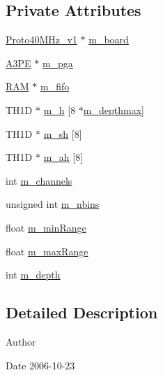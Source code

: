 \subsection*{Private Attributes}
\begin{DoxyCompactItemize}
\item 
\hyperlink{classProto40MHz__v1}{Proto40MHz\_\-v1} $\ast$ \hyperlink{classStorageFifoAcquisition_a86f825b4740c5dcde26933b6debf452f}{m\_\-board}
\item 
\hyperlink{classA3PE}{A3PE} $\ast$ \hyperlink{classStorageFifoAcquisition_a30a158fb750e33fbec4f2f9ee8cbb68f}{m\_\-pga}
\item 
\hyperlink{classRAM}{RAM} $\ast$ \hyperlink{classStorageFifoAcquisition_a5405a161dc3983274ccdfdf83687d98d}{m\_\-fifo}
\item 
TH1D $\ast$ \hyperlink{classStorageFifoAcquisition_a19913cfc87da82b107e49399e3e9b754}{m\_\-h} \mbox{[}8 $\ast$\hyperlink{classStorageFifoAcquisition_a2f3ce0569ee9ec4fa78ec66a9cbe6ed7}{m\_\-depthmax}\mbox{]}
\item 
TH1D $\ast$ \hyperlink{classStorageFifoAcquisition_ace3efa07a424f66783388ad073b31830}{m\_\-sh} \mbox{[}8\mbox{]}
\item 
TH1D $\ast$ \hyperlink{classStorageFifoAcquisition_ac73454f960b6224d7fe3d104b4b7a51b}{m\_\-ah} \mbox{[}8\mbox{]}
\item 
int \hyperlink{classStorageFifoAcquisition_ae3563f586533ac15f48c7f9c8fea3e7f}{m\_\-channels}
\item 
unsigned int \hyperlink{classStorageFifoAcquisition_af5f50ba5a71654324d96eddc4d578571}{m\_\-nbins}
\item 
float \hyperlink{classStorageFifoAcquisition_ad3cf1ef4173ffe14a0e86b7b8ec8d90b}{m\_\-minRange}
\item 
float \hyperlink{classStorageFifoAcquisition_adbe54adb957ea13ae6ff9e56b7e398c8}{m\_\-maxRange}
\item 
int \hyperlink{classStorageFifoAcquisition_a6bebf76cce0ccaae599c844a69ebd19d}{m\_\-depth}
\end{DoxyCompactItemize}


\subsection{Detailed Description}
\begin{DoxyAuthor}{Author}

\end{DoxyAuthor}
\begin{DoxyDate}{Date}
2006-\/10-\/23 
\end{DoxyDate}


